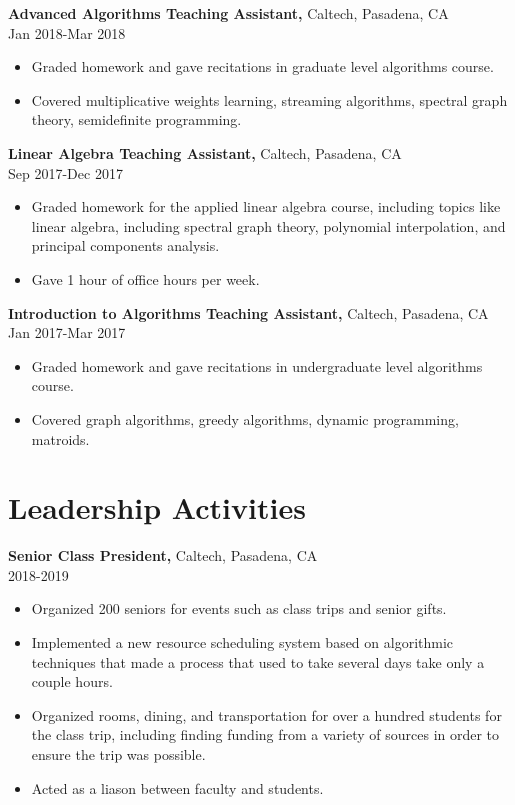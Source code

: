 \documentclass[margin]{res}
\begin{document}
\begin{resume}
{\bf Advanced Algorithms Teaching Assistant,} Caltech, Pasadena, CA \\ Jan 2018-Mar 2018
\begin{itemize} \itemsep -2pt %
\item Graded homework and gave recitations in graduate level algorithms course.
\item Covered multiplicative weights learning, streaming algorithms,
spectral graph theory, semidefinite programming.
\end{itemize}
 
{\bf Linear Algebra Teaching Assistant,} Caltech, Pasadena, CA \\ Sep 2017-Dec 2017
\begin{itemize} \itemsep -2pt %
\item Graded homework for the applied linear algebra course, including topics like linear algebra, including spectral graph theory, polynomial
interpolation, and principal components analysis.
\item Gave 1 hour of office hours per week.
\end{itemize}
 
{\bf Introduction to Algorithms Teaching Assistant,} Caltech, Pasadena, CA \\ Jan 2017-Mar 2017
\begin{itemize} \itemsep -2pt %
\item Graded homework and gave recitations in undergraduate level algorithms course.
\item Covered graph algorithms, greedy algorithms, dynamic programming, matroids.
\end{itemize}

\section{Leadership   Activities} 
       {\bf Senior Class President,} Caltech, Pasadena, CA    \\         2018-2019 
        \begin{itemize} \itemsep -2pt
          \item Organized 200 seniors for events such as class trips and senior gifts.
          \item Implemented a new resource scheduling system based on algorithmic techniques that made a process that used to take several days take only a couple hours.
          \item Organized rooms, dining, and transportation for over a hundred students for the class trip, including finding funding from a variety of sources in order to ensure the trip was possible.
          \item Acted as a liason between faculty and students.
		 \end{itemize}


\end{resume}
\end{document}
